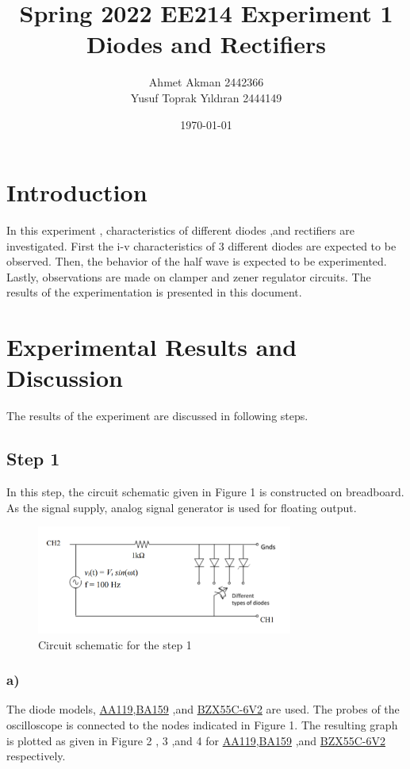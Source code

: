 \documentclass[letterpaper,12pt]{article}
\begin{document}
\thispagestyle{empty}

\title{Spring 2022 EE214 Experiment 1  \protect\\ Diodes and Rectifiers}
\author{Ahmet Akman 2442366 \protect\\ Yusuf Toprak Yıldıran 2444149}
\date{\today}
\maketitle
\tableofcontents
\section{Introduction}
In this experiment ,  characteristics of different  diodes ,and rectifiers are investigated. First the i-v characteristics of 3 different diodes are expected to be observed. Then, the behavior of the half wave is expected to be experimented. Lastly, observations are made on clamper and  zener regulator circuits. The results of the experimentation is presented in this document.
\section{Experimental Results and Discussion}
The results of the experiment are discussed in following steps.
\subsection{Step 1}
In this step, the circuit schematic given in Figure 1 is constructed on breadboard. As the signal supply, analog signal generator is used for floating output.
\begin{figure}[H]
\centering
\includegraphics[width = 0.75\textwidth]{1_1.png}
\caption{Circuit schematic for the step 1}
\end{figure} 

\subsubsection{a)}
The diode models, \href{https://logosfoundation.org/elektron/mixers/AA119.pdf}{AA119},\href{https://www.vishay.com/docs/88536/ba157.pdf}{BA159}  ,and \href{https://www.vishay.com/docs/85604/bzx55.pdf}{BZX55C-6V2} are used. The probes of the oscilloscope is connected to the nodes indicated in Figure 1. The resulting graph is plotted as given in Figure 2 , 3 ,and 4 for 
\href{https://logosfoundation.org/elektron/mixers/AA119.pdf}{AA119},\href{https://www.vishay.com/docs/88536/ba157.pdf}{BA159}  ,and \href{https://www.vishay.com/docs/85604/bzx55.pdf}{BZX55C-6V2} respectively.
\end{document}
